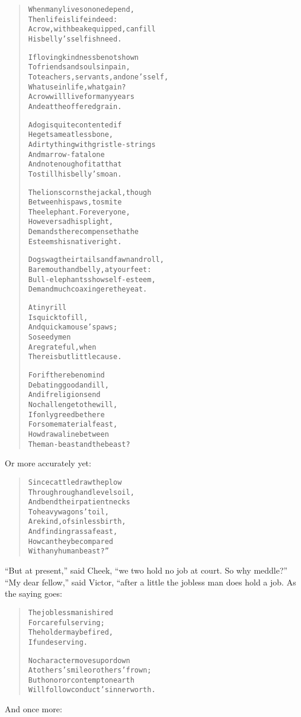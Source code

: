 \documentclass[article, twoside, 14pt]{memoir}
\renewenvironment{verbatim}{%
\begin{quote}%
\vskip -10pt%
\begin{alltt}\normalfont\large}{\end{alltt}%
\end{quote}%
\vskip -10pt
} %
\begin{document}
\begin{verbatim}
When many lives on one depend,
    Then life is life indeed:
A crow, with beak equipped, can fill
    His belly's selfish need.

If loving kindness be not shown
    To friends and souls in pain,
To teachers, servants, and one's self,
    What use in life, what gain?
A crow will live for many years
    And eat the offered grain.

A dog is quite contented if
    He gets a meatless bone,
A dirty thing with gristle-strings
    And marrow-fat alone{\textemdash}
And not enough of it at that
    To still his belly's moan.

The lion scorns the jackal, though
    Between his paws, to smite
The elephant. For everyone,
    However sad his plight,
Demands the recompense that he
    Esteems his native right.

Dogs wag their tails and fawn and roll,
    Bare mouth and belly, at your feet:
Bull-elephants show self-esteem,
    Demand much coaxing ere they eat.

A tiny rill
Is quick to fill,
    And quick a mouse's paws;
So seedy men
Are grateful, when
    There is but little cause.

For if there be no mind
    Debating good and ill,
And if religion send
    No challenge to the will,
If only greed be there
    For some material feast,
How draw a line between
    The man-beast and the beast?
\end{verbatim}
Or more accurately yet:

\begin{verbatim}
Since cattle draw the plow
    Through rough and level soil,
And bend their patient necks
    To heavy wagons' toil,
Are kind, of sinless birth,
    And find in grass a feast,
How can they be compared
    With any human beast?”
\end{verbatim}
``But at present,'' said Cheek,
``we two hold no job at court. So why meddle?'' ``My dear fellow,''
said Victor, “after a little the jobless man does hold a job. As
the saying goes:

\begin{verbatim}
The jobless man is hired
    For careful serving;
The holder may be fired,
    If undeserving.

No character moves up or down
At others' smile or others' frown;
But honor or contempt on earth
Will follow conduct's inner worth.
\end{verbatim}
And once more:
\end{document}
